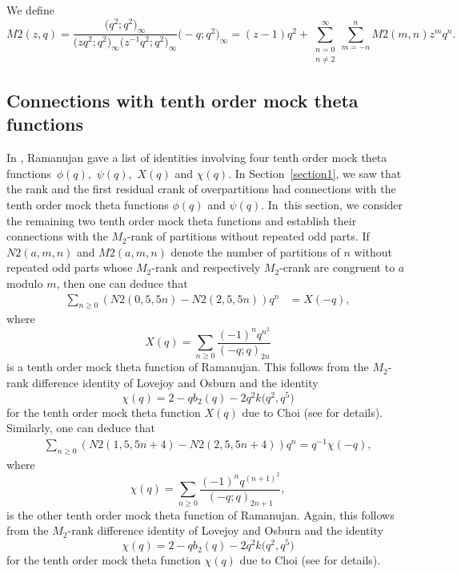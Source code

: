 \documentclass[pdftex]{sigma}
\numberwithin{equation}{section}
\begin{document}
We define \begin{equation*}%
M2(z,q) = \dfrac{\bigl(q^2;q^2\bigr)_{\infty}}{\bigl(zq^2;q^2\bigr)_{\infty}\bigl(z^{-1}q^2;q^2\bigr)_{\infty}}\bigl(-q;q^2\bigr)_{\infty} = (z-1)q^2 + \sum_{\substack{n=0\\ n\neq 2}}^\infty \sum_{m=-n}^n M2(m,n) z^m q^n.
\end{equation*}

\subsection{Connections with tenth order mock theta functions}

In \cite[p.~9]{Ra88}, Ramanujan gave a list of identities involving four tenth order mock theta functions~$\phi(q)$,~$\psi(q)$,~$X(q)$ and $\chi(q)$. In Section~\ref{section1}, we saw that the rank and the first residual crank of overpartitions had connections with the tenth order mock theta functions $\phi(q)$ and $\psi(q)$. In~this section, we consider the remaining two tenth order mock theta functions and establish their connections with the $M_2$-rank of partitions without repeated odd parts. If $N2(a,m,n)$ and $M2(a,m,n)$ denote the number of partitions of $n$ without repeated odd parts whose $M_2$-rank and respectively $M_2$-crank are congruent to $a$ modulo $m$, then one can deduce that
\begin{align*}
\sum_{n\geq 0}(N2(0,5,5n)-N2(2,5,5n))q^n&=X(-q),
\end{align*}
where
\begin{equation*}
X(q)=\sum\limits_{n\geq 0}\frac{(-1)^nq^{n^2}}{(-q;q)_{2n}}
\end{equation*}
is a tenth order mock theta function of Ramanujan. This follows from the $M_2$-rank difference identity of Lovejoy and Osburn \cite[equation~(1.11)]{Lo-Os09} and the identity
\begin{equation*}
\chi(q)=2-qb_2(q)-2q^2k\bigl(q^2,q^5\bigr)
\end{equation*}
for the tenth order mock theta function $X(q)$ due to Choi ({see \cite[p.~183]{Ch00} for details}). Similarly, one can deduce that
\begin{align*}
\sum_{n\geq 0}(N2(1,5,5n+4)-N2(2,5,5n+4))q^n=q^{-1}\chi(-q),
\end{align*}
where
\[
\chi(q)=\sum\limits_{n\geq 0}\frac{(-1)^nq^{(n+1)^2}}{(-q;q)_{2n+1}},
\]
is the other tenth order mock theta function of Ramanujan. Again, this follows from the $M_2$-rank difference identity of Lovejoy and Osburn \cite[equation~(1.10)]{Lo-Os09} and the identity
\begin{equation*}
\chi(q)=2-qb_2(q)-2q^2k\bigl(q^2,q^5\bigr)
\end{equation*}
for the tenth order mock theta function $\chi(q)$ due to Choi (see \cite[p.~183]{Ch00} for details).
\end{document}
